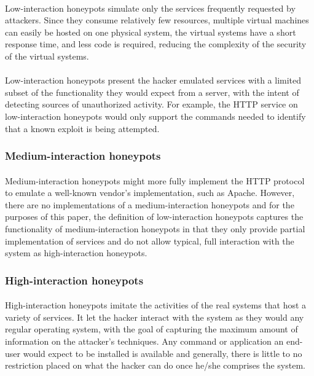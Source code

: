 \documentclass{report}
\begin{document}
\paragraph{}
Low-interaction honeypots simulate only the services frequently requested by attackers. Since they consume relatively few resources, multiple virtual machines can easily be hosted on one physical system, the virtual systems have a short response time, and less code is required, reducing the complexity of the security of the virtual systems.
\paragraph{}
Low-interaction honeypots present the hacker emulated services with a limited subset of the functionality they would expect from a server, with the intent of detecting sources of unauthorized activity. For example, the HTTP service on low-interaction honeypots would only support the commands needed to identify that a known exploit is being attempted.

\subsubsection{Medium-interaction honeypots}
\paragraph{}
Medium-interaction honeypots  might more fully implement the HTTP protocol to emulate a well-known vendor’s implementation, such as Apache. However, there are no implementations of a medium-interaction honeypots and for the purposes of this paper, the definition of low-interaction honeypots captures the functionality of medium-interaction honeypots in that they only provide partial implementation of services and do not allow typical, full interaction with the system as high-interaction honeypots.

\subsubsection{High-interaction honeypots}
\paragraph{}
High-interaction honeypots imitate the activities of the real systems that host a variety of services. It let the hacker interact with the system as they would any regular operating system, with the goal of capturing the maximum amount of information on the attacker’s techniques. Any command or application an end-user would expect to be installed is available and generally, there is little to no restriction placed on what the hacker can do once he/she comprises the system.
\end{document}
